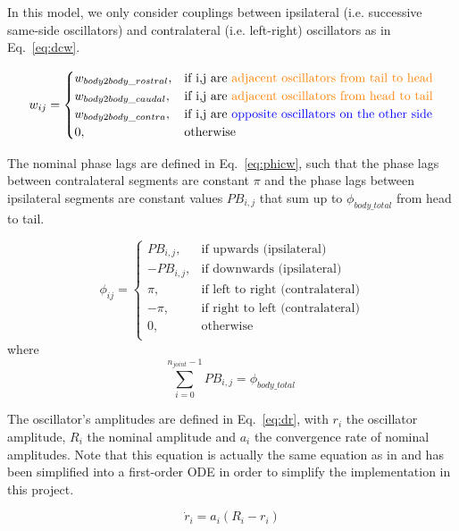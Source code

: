 \documentclass{cmc}
\begin{document}
In this model, we only consider couplings between ipsilateral (i.e. successive same-side oscillators) and contralateral (i.e. left-right) oscillators as in Eq.~\ref{eq:dcw}.

\begin{equation}
  \label{eq:dcw}
  w_{ij} =
    \begin{cases}
    w_{body2body\_rostral},& \text{if i,j are \color{orange}adjacent oscillators from tail to head} \\
    w_{body2body\_caudal},& \text{if i,j are \color{orange}adjacent oscillators from head to tail} \\
    w_{body2body\_contra}, & \text{if i,j are \color{blue}opposite oscillators on the other side}\\
    0, & \text{otherwise} \\
    \end{cases}
\end{equation}


The nominal phase lags are defined in Eq.~\ref{eq:phicw}, such that the phase lags between contralateral segments are constant $\pi$ and the phase lags between ipsilateral segments are constant values $PB_{i,j}$ that sum up to $\phi_{body\_total}$ from head to tail.


\begin{equation}
  \label{eq:phicw}
  \phi_{ij} =
    \begin{cases}
    PB_{i,j},& \text{if upwards (ipsilateral)} \\
    -PB_{i,j},& \text{if downwards (ipsilateral)}\\
    \pi,& \text{if left to right (contralateral)}\\
    -\pi,& \text{if right to left (contralateral)}\\
    0, & \text{otherwise} \\
    \end{cases}
\end{equation}
where
\[
    \sum_{i=0}^{n_{joint}-1} PB_{i,j}=\phi_{body\_total}\;
\]

The oscillator's amplitudes are defined in Eq.~\ref{eq:dr}, with $ r_i $ the
oscillator amplitude, $ R_i $ the nominal amplitude and $ a_i $ the convergence rate of nominal amplitudes. Note that this equation is actually the same equation as in \cite{ijspeert2007swimming} and has been simplified into a first-order ODE in order to simplify the implementation in this project.

\begin{equation}
  \label{eq:dr}
  \dot{r}_i = a_i (R_i - r_i)
\end{equation}
\end{document}
